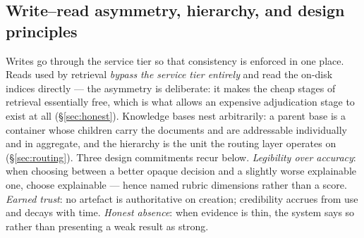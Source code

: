 \documentclass[sigconf, review, anonymous]{acmart}
\begin{document}
\subsection{Write--read asymmetry, hierarchy, and design principles}\label{sec:sys-asymmetry}
Writes go through the service tier so that consistency is enforced in one place.
Reads used by retrieval \emph{bypass the service tier entirely} and read the
on-disk indices directly --- the asymmetry is deliberate: it makes the cheap
stages of retrieval essentially free, which is what allows an expensive
adjudication stage to exist at all (\S\ref{sec:honest}). Knowledge bases nest
arbitrarily: a parent base is a container whose children carry the documents and
are addressable individually and in aggregate, and the hierarchy is the unit the
routing layer operates on (\S\ref{sec:routing}). Three design commitments recur
below. \emph{Legibility over accuracy}: when choosing between a better opaque
decision and a slightly worse explainable one, choose explainable --- hence
named rubric dimensions rather than a score. \emph{Earned trust}: no artefact
is authoritative on creation; credibility accrues from use and decays with
time. \emph{Honest absence}: when evidence is thin, the system says so rather
than presenting a weak result as strong.
\end{document}
